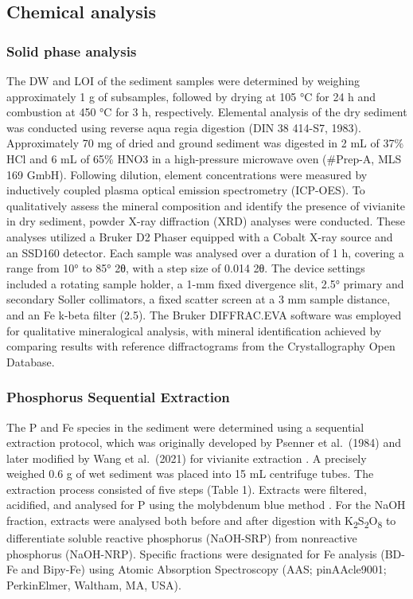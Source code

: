 \documentclass[12pt,twoside]{book}
\begin{document}
\subsection{Chemical analysis}\label{chemical-analysis}

\subsubsection{Solid phase analysis}\label{solid-phase-analysis}

The DW and LOI of the sediment samples were determined by weighing approximately 1 g of subsamples, followed by drying at 105 °C for 24 h and combustion at 450 °C for 3 h, respectively. Elemental analysis of the dry sediment was conducted using reverse aqua regia digestion (DIN 38 414-S7, 1983). Approximately 70 mg of dried and ground sediment was digested in 2 mL of 37\% HCl and 6 mL of 65\% HNO3 in a high-pressure microwave oven (\#Prep-A, MLS 169 GmbH). Following dilution, element concentrations were measured by inductively coupled plasma optical emission spectrometry (ICP-OES).
To qualitatively assess the mineral composition and identify the presence of vivianite in dry sediment, powder X-ray diffraction (XRD) analyses were conducted. These analyses utilized a Bruker D2 Phaser equipped with a Cobalt X-ray source and an SSD160 detector. Each sample was analysed over a duration of 1 h, covering a range from 10° to 85° 2θ, with a step size of 0.014 2θ. The device settings included a rotating sample holder, a 1-mm fixed divergence slit, 2.5° primary and secondary Soller collimators, a fixed scatter screen at a 3 mm sample distance, and an Fe k-beta filter (2.5). The Bruker DIFFRAC.EVA software was employed for qualitative mineralogical analysis, with mineral identification achieved by comparing results with reference diffractograms from the Crystallography Open Database.

\subsubsection{Phosphorus Sequential Extraction}\label{phosphorus-sequential-extraction}

The P and Fe species in the sediment were determined using a sequential extraction protocol, which was originally developed by Psenner et al.~(1984) and later modified by Wang et al.~(2021) for vivianite extraction \citep{Psenner1984, Wang2021}. A precisely weighed 0.6 g of wet sediment was placed into 15 mL centrifuge tubes. The extraction process consisted of five steps (Table 1). Extracts were filtered, acidified, and analysed for P using the molybdenum blue method \citep{Murphy1962}. For the NaOH fraction, extracts were analysed both before and after digestion with K\textsubscript{2}S\textsubscript{2}O\textsubscript{8} to differentiate soluble reactive phosphorus (NaOH-SRP) from nonreactive phosphorus (NaOH-NRP). Specific fractions were designated for Fe analysis (BD-Fe and Bipy-Fe) using Atomic Absorption Spectroscopy (AAS; pinAAcle9001; PerkinElmer, Waltham, MA, USA).
\end{document}
